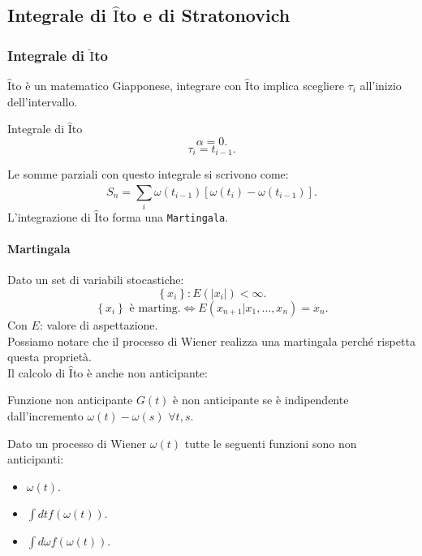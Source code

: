 \subsection{Integrale di $\hat{\text{I}}$to e di Stratonovich}%
\label{sub:Integrale di Ito e di Stratonovich}
\subsubsection{Integrale di $\hat{\text{I}}$to}%
\label{subsub:Integrale di Ito}
$\hat{\text{I}}$to è un matematico Giapponese, integrare con $\hat{\text{I}}$to implica scegliere $\tau_i$ all'inizio dell'intervallo.
\begin{bluebox}{Integrale di $\hat{\text{I}}$to}
    \[
        \alpha  = 0
    .\] 
    \[
	\tau_i = t_{i-1}
    .\] 
\end{bluebox}
\noindent
Le somme parziali con questo integrale si scrivono come:
\[
    S_n = \sum_{i}^{} \omega (t_{i-1}) \left[\omega (t_i) -\omega (t_{i-1}) \right]
.\]
L'integrazione di $\hat{\text{I}}$to forma una \texttt{Martingala}.
\paragraph{Martingala}%
\label{par:Martingala}
Dato un set di variabili stocastiche:
\[
    \left\{x_i\right\}: E(\left|x_i\right|) < \infty
.\] 
\[
    \left\{x_i\right\} \text{ è marting.} \iff
    E(x_{n+1}|x_1,\ldots,x_n) = x_n
.\] 
Con $E$: valore di aspettazione.\\
Possiamo notare che il processo di Wiener realizza una martingala perché rispetta questa proprietà.\\
Il calcolo di $\hat{\text{I}}$to è anche non anticipante:
\begin{redbox}{Funzione non anticipante}
    $G(t)$ è non anticipante se è indipendente dall'incremento $\omega (t) - \omega (s) $ $\forall t, s$.
\end{redbox}
\noindent
\begin{exmp}
    Dato un processo di Wiener $\omega (t)$ tutte le seguenti funzioni sono non anticipanti:
    \begin{itemize}
	\item $\omega (t) $.
	\item $\int dt f(\omega (t) ) $.
	\item $\int d\omega f(\omega (t) ) $.
    \end{itemize}
\end{exmp}
\noindent
